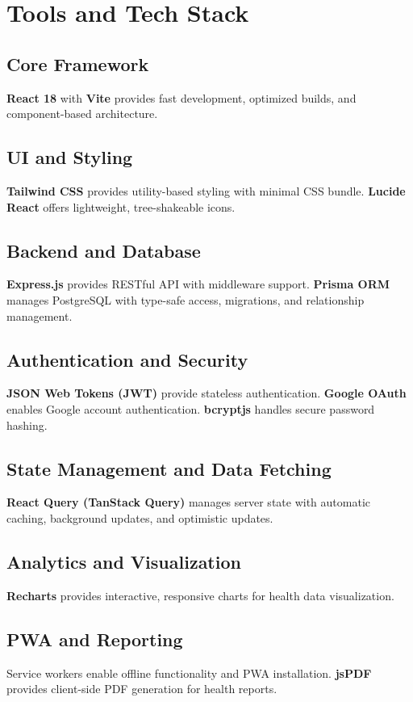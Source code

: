 \documentclass[12pt, a4paper]{report}
\begin{document}
\chapter{Tools and Tech Stack}

\section{Core Framework}
\textbf{React 18} with \textbf{Vite} provides fast development, optimized builds, and component-based architecture.

\section{UI and Styling}
\textbf{Tailwind CSS} provides utility-based styling with minimal CSS bundle. \textbf{Lucide React} offers lightweight, tree-shakeable icons.

\section{Backend and Database}
\textbf{Express.js} provides RESTful API with middleware support. \textbf{Prisma ORM} manages PostgreSQL with type-safe access, migrations, and relationship management.

\section{Authentication and Security}
\textbf{JSON Web Tokens (JWT)} provide stateless authentication. \textbf{Google OAuth} enables Google account authentication. \textbf{bcryptjs} handles secure password hashing.

\section{State Management and Data Fetching}
\textbf{React Query (TanStack Query)} manages server state with automatic caching, background updates, and optimistic updates.

\section{Analytics and Visualization}
\textbf{Recharts} provides interactive, responsive charts for health data visualization.

\section{PWA and Reporting}
Service workers enable offline functionality and PWA installation. \textbf{jsPDF} provides client-side PDF generation for health reports.
\end{document}
